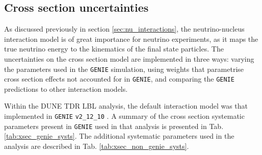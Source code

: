 \subsection{Cross section uncertainties}

As discussed previously in section \ref{sec:nu_interactions}, the neutrino-nucleus interaction model is of great importance for neutrino experiments, as it maps the true neutrino energy to the kinematics of the final state particles. The uncertainties on the cross section model are implemented in three ways: varying the parameters used in the \texttt{GENIE} simulation, using weights that parametrise cross section effects not accounted for in \texttt{GENIE}, and comparing the \texttt{GENIE} predictions to other interaction models.

Within the DUNE TDR LBL analysis, the default interaction model was that implemented in \texttt{GENIE} \texttt{v2_12_10} \cite{DUNE2021}. A summary of the cross section systematic parameters present in \texttt{GENIE} used in that analysis is presented in Tab. \ref{tab:xsec_genie_systs}. The additional systematic parameters used in the analysis are described in Tab. \ref{tab:xsec_non_genie_systs}.

